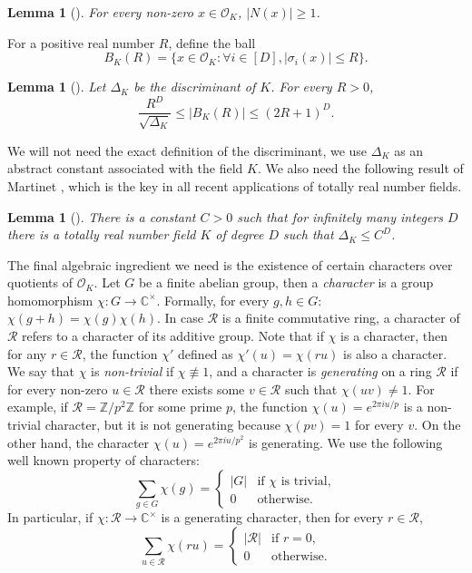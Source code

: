 \documentclass[11pt]{article}
\theoremstyle{plain}
\newtheorem{lemma}[theorem]{Lemma}
\theoremstyle{definition}
\begin{document}
	\begin{lemma}[\cite{Marcus}]\label{lemma:norm}
		For every non-zero $x\in \mathcal{O}_K$, $|N(x)|\geq 1$. 
	\end{lemma}
	
	For a positive real number $R$, define the ball
	$$B_K(R)=\{x\in \mathcal{O}_K: \forall i\in [D], |\sigma_i(x)|\leq R\}.$$
	
	\begin{lemma}[\cite{BSSZ}]\label{lemma:ball_size}
		Let $\Delta_K$ be the discriminant of $K$. For every $R>0$,
		$$\frac{R^D}{\sqrt{\Delta_K}}\leq |B_K(R)|\leq (2R+1)^D.$$
	\end{lemma}
	
	We will not need the exact definition of the discriminant, we use $\Delta_K$ as an abstract constant associated with the field $K$. We also need the following result of Martinet \cite{Mart}, which is the key in all recent applications of totally real number fields.
	
	\begin{lemma}[\cite{Mart}]
		There is a constant $C>0$ such that for infinitely many integers $D$ there is a totally real number field $K$ of degree $D$ such that $\Delta_K\leq C^D$.
	\end{lemma}
	
	The final algebraic ingredient we need is the existence of certain characters over quotients of $\mathcal{O}_K$. Let $G$ be a finite abelian group, then a  \emph{character} is a group homomorphism $\chi:G\rightarrow \mathbb{C}^{\times}$. Formally, for every $g,h\in G$:  $\chi(g+h)=\chi(g)\chi(h)$. In case $\mathcal{R}$ is a finite commutative ring, a character of $\mathcal{R}$ refers to a character of its additive group. Note that if $\chi$ is a character, then for any $r\in \mathcal{R}$, the function $\chi'$ defined as $\chi'(u)=\chi(ru)$ is also a character. We say that $\chi$ is \emph{non-trivial} if $\chi\not\equiv 1$, and a character is \emph{generating} on a ring $\mathcal{R}$ if for every non-zero $u\in \mathcal{R}$ there exists some $v\in \mathcal{R}$ such that $\chi(uv)\neq 1$. For example, if $\mathcal{R}=\mathbb{Z}/p^2\mathbb{Z}$ for some prime $p$, the function $\chi(u)=e^{2\pi i u/p}$ is a non-trivial character, but  it is not generating because $\chi(pv)=1$ for every $v$. On the other hand, the character $\chi(u)=e^{2\pi i u/p^2}$ is generating. We use the following well known property of characters: 
	$$\sum_{g\in G} \chi(g)=\begin{cases} |G| &\text{if }\chi\text{ is trivial},\\
		0 &\text{otherwise}.\end{cases}$$
	In particular, if $\chi:\mathcal{R}\rightarrow\mathbb{C}^{\times}$ is a generating character, then for every $r\in \mathcal{R}$,
	$$\sum_{u\in\mathcal{R}}\chi(ru)=\begin{cases} |\mathcal{R}| &\text{if }r=0,\\
		0 &\text{otherwise}.\end{cases}$$
	
\end{document}

